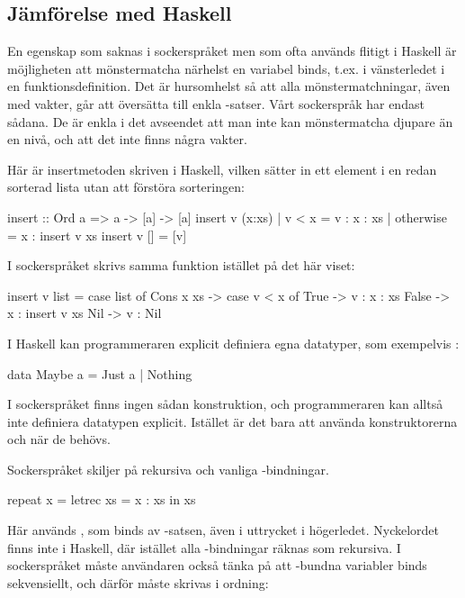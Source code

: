 \documentclass[Rapport]{subfiles}
\begin{document}
\subsection{Jämförelse med Haskell}

    En egenskap som saknas i sockerspråket men som ofta används flitigt i Haskell är 
möjligheten att mönstermatcha närhelst en variabel binds, t.ex. i vänsterledet
i en funktionsdefinition. Det är hursomhelst så att alla mönstermatchningar,
även med vakter, går att översätta till enkla -satser. Vårt sockerspråk
har endast sådana. De är enkla i det avseendet att man inte kan mönstermatcha djupare
än en nivå, och att det inte finns några vakter.

Här är insertmetoden skriven i Haskell, vilken sätter in ett element i en redan sorterad
lista utan att förstöra sorteringen:

\begin{codeEx}
  insert :: Ord a => a -> [a] -> [a]
  insert v (x:xs) 
      | v < x     = v : x : xs
      | otherwise = x : insert v xs 
  insert v [] = [v]
\end{codeEx}                  

I sockerspråket skrivs samma funktion istället på det här viset:

\begin{codeEx}
  insert v list = case list of
      Cons x xs -> case v < x of
          True  -> v : x : xs
          False -> x : insert v xs
      Nil -> v : Nil
\end{codeEx}

I Haskell kan programmeraren explicit definiera egna datatyper, som exempelvis :
    
\begin{codeEx}
data Maybe a = Just a | Nothing
\end{codeEx}

I sockerspråket finns ingen sådan konstruktion, och programmeraren kan alltså inte
definiera datatypen explicit. Istället är det bara att använda
konstruktorerna  och  när de behövs.


Sockerspråket skiljer på rekursiva och vanliga -bindningar. 

\begin{codeEx}
repeat x = letrec xs = x : xs in xs  
\end{codeEx}

Här används , som binds av -satsen, även i uttrycket i högerledet.
Nyckelordet  finns inte i Haskell, där istället alla -bindningar räknas som rekursiva. I
sockerspråket måste användaren också tänka på att -bundna variabler binds
sekvensiellt, och därför måste skrivas i ordning:
\end{document}
